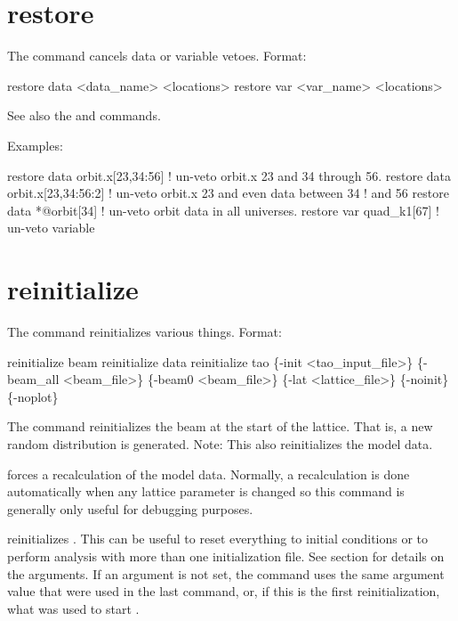 \section{restore}
\label{s:restore}

The  command cancels data or variable
vetoes. Format:
\begin{example}
  restore data  <data_name> <locations>
  restore var <var_name> <locations>
\end{example}

\vskip 0.2in 
See also the 
and  commands.

Examples:
\begin{example}
  restore data orbit.x[23,34:56]   ! un-veto orbit.x 23 and 34 through 56.
  restore data orbit.x[23,34:56:2] ! un-veto orbit.x 23 and even data between 34 
                                   !                                          and 56
  restore data *@orbit[34]         ! un-veto orbit data in all universes.
  restore var quad_k1[67]          ! un-veto variable
\end{example}

\section{reinitialize}
\label{s:reinit}

The  command reinitializes various things. Format:
\begin{example}
  reinitialize beam
  reinitialize data
  reinitialize tao \{-init <tao_input_file>\} \{-beam_all <beam_file>\} 
     \{-beam0 <beam_file>\} \{-lat <lattice_file>\} \{-noinit\} \{-noplot\}
\end{example}

\vskip 0.2in 

The  command reinitializes the beam at the start
of the lattice. That is, a new random distribution is generated. 
Note: This also reinitializes the model data.

 forces a recalculation of the model data.
Normally, a recalculation is done automatically when any lattice
parameter is changed so this command is generally only useful for
debugging purposes.

 reinitializes \tao. This can be useful to reset
everything to initial conditions or to perform analysis with more than
one initialization file.  See section  for
details on the arguments.  If an argument is not set, the
 command uses the same argument value that were used in
the last  command, or, if this is the first
reinitialization, what was used to start \tao. 

